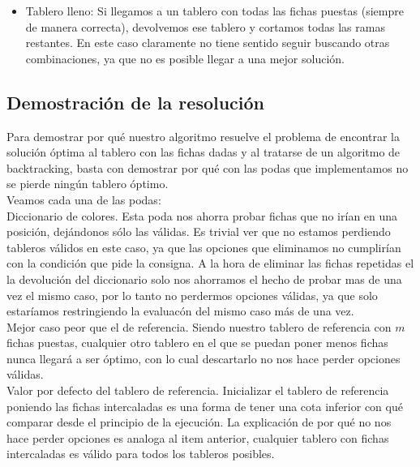 \begin{itemize}
\item Tablero lleno: Si llegamos a un tablero con todas las fichas puestas (siempre de manera correcta), devolvemos ese tablero y cortamos todas las ramas restantes. En este caso claramente no tiene sentido seguir buscando otras combinaciones, ya que no es posible llegar a una mejor soluci\'on.

\end{itemize}

\subsection{Demostraci\'on de la resoluci\'on}

Para demostrar por qu\'e nuestro algoritmo resuelve el problema de encontrar la soluci\'on \'optima al tablero con las fichas dadas y al tratarse de un algoritmo de backtracking, basta con demostrar por qu\'e con las podas que implementamos no se pierde ning\'un tablero \'optimo.\\

Veamos cada una de las podas:\\

Diccionario de colores. Esta poda nos ahorra probar fichas que no ir\'ian en una posici\'on, dej\'andonos s\'olo las v\'alidas. Es trivial ver que no estamos perdiendo tableros v\'alidos en este caso, ya que las opciones que eliminamos no cumplir\'ian con la condici\'on que pide la consigna. A la hora de eliminar las fichas repetidas el la devoluci\'on del diccionario solo nos ahorramos el hecho de probar mas de una vez el mismo caso,  por lo tanto no perdermos opciones v\'alidas, ya que solo estar\'iamos restringiendo la evaluac\'on del mismo caso m\'as de una vez.\\

Mejor caso peor que el de referencia. Siendo nuestro tablero de referencia con $m$ fichas puestas, cualquier otro tablero en el que se puedan poner menos fichas nunca llegar\'a a ser \'optimo, con lo cual descartarlo no nos hace perder opciones v\'alidas.\\

Valor por defecto del tablero de referencia. Inicializar el tablero de referencia poniendo las fichas intercaladas es una forma de tener una cota inferior con qu\'e comparar desde el principio de la ejecuci\'on. La explicaci\'on de por qu\'e no nos hace perder opciones es analoga al item anterior, cualquier tablero con fichas intercaladas es v\'alido para todos los tableros posibles. \\


